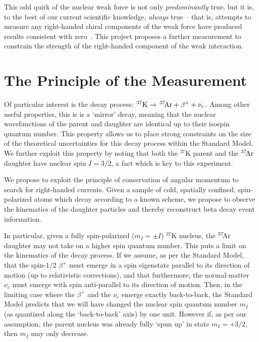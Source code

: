 This odd quirk of the nuclear weak force is not only \emph{predominantly} true, but it is, to the best of our current scientific knowledge, \emph{always} true -- that is, attempts to measure any right-handed chiral components of the weak force have produced results consistent with zero~\cite{severijns_beck_cuncic_2006}\cite{severijns_cuncic_2011}.  This project proposes a further measurement to constrain the strength of the right-handed component of the weak interaction.  

%
\section{The Principle of the Measurement}
\label{principle}
Of particular interest is the decay process: $^{37}\textrm{K} \rightarrow \,^{37}\textrm{\!Ar} + \beta^{+} + \nu_e$.  Among other useful properties, this is is a `mirror' decay, 
meaning that the nuclear wavefunctions of the parent and daughter are identical up to their isospin quantum number.  
This property allows us to place strong constraints on the size of the theoretical uncertainties for this decay process within the Standard Model.   We further exploit this property by noting that both the $^{37}\textrm{K}$ parent and the $^{37}\textrm{\!Ar}$ daughter have nuclear spin $I=3/2$, a fact which is key to this experiment.

We propose to exploit the principle of conservation of angular momentum to search for right-handed currents.  Given a sample of cold, spatially confined, spin-polarized atoms which decay according to a known scheme, we propose to observe the kinematics of the daughter particles and thereby reconstruct beta decay event information.  

In particular, given a fully spin-polarized ($m_I=\pm I$) 
$^{37}\textrm{K}$ nucleus, the $^{37}\textrm{\!Ar}$ daughter may not take on a higher spin quantum number.  This puts a limit on the kinematics of the decay process.  If we assume, as per the Standard Model, that the spin-$1/2$ $\beta^+$ must emerge in a spin eigenstate parallel to its direction of motion (up to relativistic corrections), and that furthermore, the normal-matter $\nu_e$ must emerge with spin anti-parallel to its direction of motion.  Then, in the limiting case where the $\beta^+$ and the $\nu_e$ emerge exactly back-to-back, the Standard Model predicts that we will have changed the nuclear spin quantum number $m_I$ (as quantized along the `back-to-back' axis) by one unit.  However if, as per our assumption, the parent nucleus was already fully `spun up' in state $m_I = +3/2$, then $m_I$ may only decrease.

